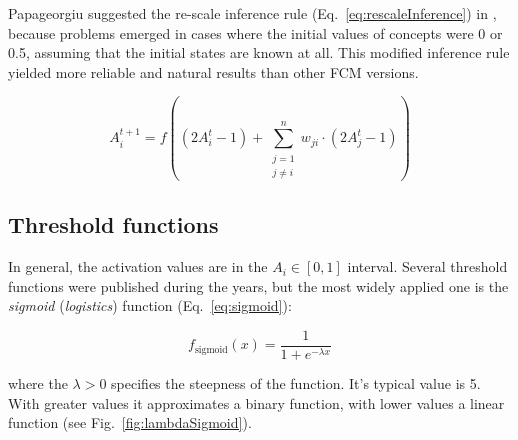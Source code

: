 \documentclass[graybox]{svmult}
\begin{document}
Papageorgiu suggested the re-scale inference rule (Eq.~\ref{eq:rescaleInference}) in \cite{papageorgioue.i.2011}, because problems emerged in cases where the initial values of concepts were 0 or 0.5, assuming that the initial states are known at all. This modified inference rule yielded more reliable and natural results than other FCM versions.

\begin{equation}
\label{eq:rescaleInference}
A_{i}^{t+1} = f \left( (2A_i^t-1) + \sum_{\substack{j=1\\j \ne i}}^{n} w_{ji}\cdot(2A_j^t-1) \right)
\end{equation}

\subsection{Threshold functions}

In general, the activation values are in the $A_{i}\in[0, 1]$ interval. Several threshold functions were published during the years, but the most widely applied one is the \emph{sigmoid} (\emph{logistics}) function (Eq.~\ref{eq:sigmoid}):

\begin{equation}
\label{eq:sigmoid}
f_{\textrm{sigmoid}}(x) = \frac{1}{1+e^{-\lambda x}}
\end{equation}

where the $\lambda > 0$ specifies the steepness of the function. It's typical value is 5. With greater values it approximates a binary function, with lower values a linear function (see Fig.~\ref{fig:lambdaSigmoid}). 
\end{document}
